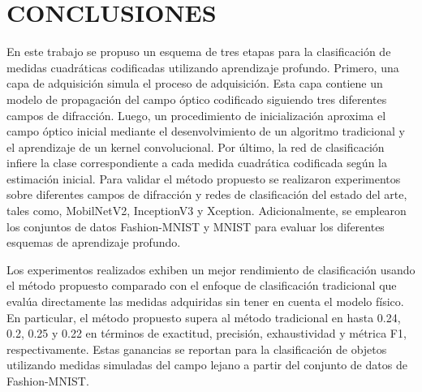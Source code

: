 
\chapter{CONCLUSIONES}


En este trabajo se propuso un esquema de tres etapas para la clasificación de medidas cuadráticas codificadas utilizando aprendizaje profundo. Primero, una capa de adquisición simula el proceso de adquisición. Esta capa contiene un modelo de propagación del campo óptico codificado siguiendo tres diferentes campos de difracción. Luego, un procedimiento de inicialización aproxima el campo óptico inicial mediante el desenvolvimiento de un algoritmo tradicional y el aprendizaje de un kernel convolucional. Por último, la red de clasificación infiere la clase correspondiente a cada medida cuadrática codificada según la estimación inicial. Para validar el método propuesto se realizaron experimentos sobre diferentes campos de difracción y redes de clasificación del estado del arte, tales como, MobilNetV2, InceptionV3 y Xception. Adicionalmente, se emplearon los conjuntos de datos Fashion-MNIST y MNIST para evaluar los diferentes esquemas de aprendizaje profundo.

Los experimentos realizados exhiben un mejor rendimiento de clasificación usando el método propuesto comparado con el enfoque de clasificación tradicional que evalúa directamente las medidas adquiridas sin tener en cuenta el modelo físico. En particular, el método propuesto supera al método tradicional en hasta 0.24, 0.2, 0.25 y 0.22 en términos de exactitud, precisión, exhaustividad y métrica F1, respectivamente. Estas ganancias se reportan para la clasificación de objetos utilizando medidas simuladas del campo lejano a partir del conjunto de datos de Fashion-MNIST.